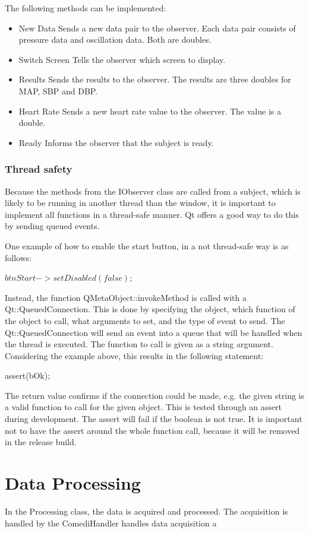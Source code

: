 The following methods can be implemented:
\begin{itemize}
\item New Data
Sends a new data pair to the observer. Each data pair consists of pressure data and oscillation data. Both are doubles.
\item Switch Screen
Tells the observer which screen to display.
\item Results
Sends the results to the observer. The results are three doubles for MAP, SBP and DBP.
\item Heart Rate
Sends a new heart rate value to the observer. The value is a double.
\item Ready
Informs the observer that the subject is ready.
\end{itemize}

\subsubsection{Thread safety}
Because the methods from the IObserver class are called from a subject, which is likely to be running in another thread than the window, it is important to implement all functions in a thread-safe manner. Qt offers a good way to do this by sending queued events. 

One example of how to enable the start button, in a not thread-safe way is as follows: 

   $ btnStart->setDisabled(false);$

Instead, the function QMetaObject::invokeMethod is called with a Qt::QueuedConnection. This is done by specifying the object, which function of the object to call, what arguments to set, and the type of event to send. The Qt::QueuedConnection will send an event into a queue that will be handled when the thread is executed. The function to call is given as a string argument. Considering the example above, this results in the following statement:

%
    assert(bOk);

The return value confirms if the connection could be made, e.g. the given string is a valid function to call for the given object. This is tested through an assert during development. The assert will fail if the boolean is not true. It is important not to have the assert around the whole function call, because it will be removed in the release build.

\section{Data Processing}
In the Processing class, the data is acquired and processed. The acquisition is handled by the ComediHandler handles data acquisition a

